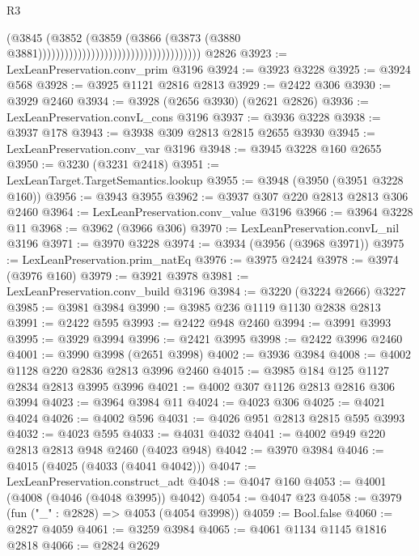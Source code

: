\begin{lexlean}{R3}
\begin{coremodule}
                                                                  (@3845
                                                                    (@3852
                                                                      (@3859
                                                                        (@3866
                                                                          (@3873
                                                                            (@3880
                                                                              @3881)))))))))))))))))))))))))))))))))))))
    @2826
@3923 := LexLeanPreservation.conv_prim @3196
@3924 := @3923 @3228
@3925 := @3924 @568
@3928 := @3925 @1121 @2816 @2813
@3929 := @2422 @306
@3930 := @3929 @2460
@3934 := @3928 (@2656 @3930) (@2621 @2826)
@3936 := LexLeanPreservation.convL_cons @3196
@3937 := @3936 @3228
@3938 := @3937 @178
@3943 := @3938 @309 @2813 @2815 @2655 @3930
@3945 := LexLeanPreservation.conv_var @3196
@3948 := @3945 @3228 @160 @2655
@3950 := @3230 (@3231 @2418)
@3951 := LexLeanTarget.TargetSemantics.lookup
@3955 := @3948 (@3950 (@3951 @3228 @160))
@3956 := @3943 @3955
@3962 := @3937 @307 @220 @2813 @2813 @306 @2460
@3964 := LexLeanPreservation.conv_value @3196
@3966 := @3964 @3228 @11
@3968 := @3962 (@3966 @306)
@3970 := LexLeanPreservation.convL_nil @3196
@3971 := @3970 @3228
@3974 := @3934 (@3956 (@3968 @3971))
@3975 := LexLeanPreservation.prim_natEq
@3976 := @3975 @2424
@3978 := @3974 (@3976 @160)
@3979 := @3921 @3978
@3981 := LexLeanPreservation.conv_build @3196
@3984 := @3220 (@3224 @2666) @3227
@3985 := @3981 @3984
@3990 := @3985 @236 @1119 @1130 @2838 @2813
@3991 := @2422 @595
@3993 := @2422 @948 @2460
@3994 := @3991 @3993
@3995 := @3929 @3994
@3996 := @2421 @3995
@3998 := @2422 @3996 @2460
@4001 := @3990 @3998 (@2651 @3998)
@4002 := @3936 @3984
@4008 := @4002 @1128 @220 @2836 @2813 @3996 @2460
@4015 := @3985 @184 @125 @1127 @2834 @2813 @3995 @3996
@4021 := @4002 @307 @1126 @2813 @2816 @306 @3994
@4023 := @3964 @3984 @11
@4024 := @4023 @306
@4025 := @4021 @4024
@4026 := @4002 @596
@4031 := @4026 @951 @2813 @2815 @595 @3993
@4032 := @4023 @595
@4033 := @4031 @4032
@4041 := @4002 @949 @220 @2813 @2813 @948 @2460 (@4023 @948)
@4042 := @3970 @3984
@4046 := @4015 (@4025 (@4033 (@4041 @4042)))
@4047 := LexLeanPreservation.construct_adt
@4048 := @4047 @160
@4053 := @4001 (@4008 (@4046 (@4048 @3995)) @4042)
@4054 := @4047 @23
@4058 := @3979 (fun ("_" : @2828) => @4053 (@4054 @3998))
@4059 := Bool.false
@4060 := @2827 @4059
@4061 := @3259 @3984
@4065 := @4061 @1134 @1145 @1816 @2818
@4066 := @2824 @2629

\end{coremodule}
\end{lexlean}
